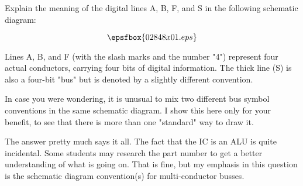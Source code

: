 

Explain the meaning of the digital lines A, B, F, and S in the following schematic diagram:

$$\epsfbox{02848x01.eps}$$







Lines A, B, and F (with the slash marks and the number "4") represent four actual conductors, carrying four bits of digital information.  The thick line (S) is also a four-bit "bus" but is denoted by a slightly different convention.

In case you were wondering, it is unusual to mix two different bus symbol conventions in the same schematic diagram.  I show this here only for your benefit, to see that there is more than one "standard" way to draw it.







The answer pretty much says it all.  The fact that the IC is an ALU is quite incidental.  Some students may research the part number to get a better understanding of what is going on.  That is fine, but my emphasis in this question is the schematic diagram convention(s) for multi-conductor busses.




